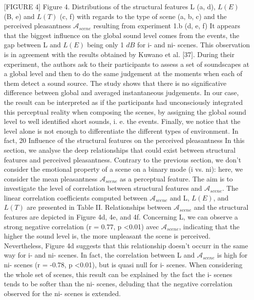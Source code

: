 [FIGURE 4] Figure 4. Distributions of the structural features L (a, d), $L(E)$ (B, e) and $L(T)$ (c, f) with regards to the type of scene (a, b, c) and the perceived pleasantness $\mathcal{A}_{scene}$ resulting from experiment 1.b (d, e, f)
It appears that the biggest influence on the global sound level comes from the events, the gap between L and $L(E)$ being only 1 $dB$ for i- and ni- scenes. This observation is in agreement with the results obtained by Kuwano et al. [37]. During their experiment, the authors ask to their participants to assess a set of soundscapes at a global level and then to do the same judgement at the moments when each of them detect a sound source. The study shows that there is no significative difference between global and averaged instantaneous judgements. In our case, the result can be interpreted as if the participants had unconsciously integrated this perceptual reality when composing the scenes, by assigning the global sound level to well identified short sounds, i. e. the events.
Finally, we notice that the level alone is not enough to differentiate the different types of environment. In fact, 20%
Influence of the structural features on the perceived pleasantness In this section, we analyse the deep relationships that could exist between structural features and perceived pleasantness. Contrary to the previous section, we don’t consider the emotional property of a scene on a binary mode (i vs. ni): here, we consider the mean pleasantness $\mathcal{A}_{scene}$ as a perceptual feature. The aim is to investigate the level of correlation between structural features and $\mathcal{A}_{scene}$. The linear correlation coefficients computed between $\mathcal{A}_{scene}$ and L, $L(E)$, and $L(T)$ are presented in Table II. Relationships between $\mathcal{A}_{scene}$ and the structural features are depicted in Figure 4d, 4e, and 4f.
Concerning L, we can observe a strong negative correlation (r = 0.77, p <0.01) avec $\mathcal{A}_{scene}$, indicating that the higher the sound level is, the more unpleasant the scene is perceived. Nevertheless, Figure 4d suggests that this relationship doesn’t occurr in the same way for i- and ni- scenes. In fact, the correlation between L and $\mathcal{A}_{scene}$ is high for ni- scenes (r = -0.78, p <0.01), but is quasi null for i- scenes. When considering the whole set of scenes, this result can be explained by the fact the i- scenes tends to be softer than the ni- scenes, deluding that the negative correlation observed for the ni- scenes is extended.
